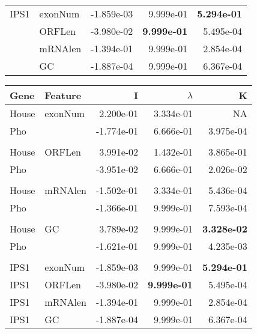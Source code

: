 \documentclass[varwidth,convert]{standalone}
\begin{document}
\begin{tabular}{llrrr}
\\
IPS1 & exonNum & -1.859e-03  & 9.999e-01 & \textbf{5.294e-01}  \\ 
 & ORFLen & -3.980e-02  & \textbf{9.999e-01} &  5.495e-04  \\ 
 & mRNAlen & -1.394e-01  & 9.999e-01  & 2.854e-04 \\ 
 & GC & -1.887e-04 & 9.999e-01  & 6.367e-04  \\ 
\bottomrule
\end{tabular}

\bigbreak

\begin{tabular}{llrrr}
\toprule
Gene & Feature & I & $\lambda$  & K  \\ 
\midrule
House & exonNum & 2.200e-01  & 3.334e-01 &         NA  \\ 
Pho &  & -1.774e-01 &  6.666e-01 &  3.975e-04  \\ 
\\
House & ORFLen & 3.991e-02 & 1.432e-01 & 3.865e-01  \\ 
Pho & & -3.951e-02  &  6.666e-01  &  2.026e-02  \\ 
\\
House & mRNAlen & -1.502e-01  &  3.334e-01 &  5.436e-04  \\ 
Pho &  & -1.366e-01  &  9.999e-01  &  7.593e-04  \\ 
\\
House & GC & 3.789e-02  & 9.999e-01 & \textbf{3.328e-02} \\ 
Pho && -1.621e-01  &  9.999e-01  &  4.235e-03  \\ 
\\
IPS1 & exonNum & -1.859e-03  & 9.999e-01 & \textbf{5.294e-01}  \\ 
IPS1 & ORFLen & -3.980e-02  & \textbf{9.999e-01} &  5.495e-04  \\ 
IPS1 & mRNAlen & -1.394e-01  & 9.999e-01  & 2.854e-04 \\ 
IPS1 & GC & -1.887e-04 & 9.999e-01  & 6.367e-04  \\ 
\bottomrule

\end{tabular}
\end{document}
